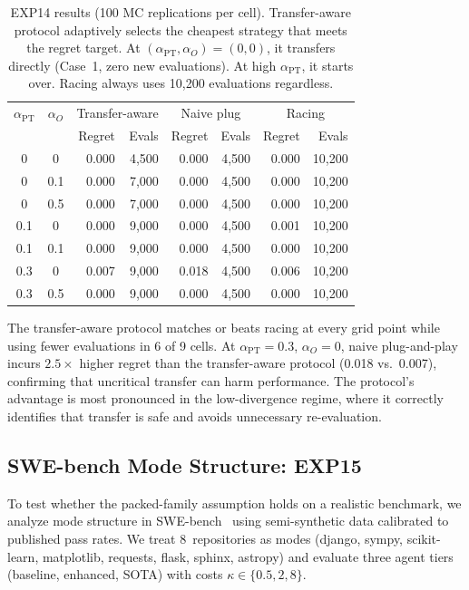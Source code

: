 \documentclass[11pt]{article}
\begin{document}
\begin{table}[t]
\centering
\caption{EXP14 results (100 MC replications per cell). Transfer-aware
  protocol adaptively selects the cheapest strategy that meets the
  regret target. At $(\alpha_{\mathrm{PT}}, \alpha_O) = (0, 0)$, it
  transfers directly (Case~1, zero new evaluations). At high
  $\alpha_{\mathrm{PT}}$, it starts over. Racing always uses
  10,200 evaluations regardless.}
\label{tab:exp14}
\small
\begin{tabular}{@{}cc|rr|rr|rr@{}}
\toprule
$\alpha_{\mathrm{PT}}$ & $\alpha_O$ &
  \multicolumn{2}{c|}{Transfer-aware} &
  \multicolumn{2}{c|}{Naive plug} &
  \multicolumn{2}{c}{Racing} \\
& & Regret & Evals & Regret & Evals & Regret & Evals \\
\midrule
0   & 0   & 0.000 & 4,500  & 0.000 & 4,500  & 0.000 & 10,200 \\
0   & 0.1 & 0.000 & 7,000  & 0.000 & 4,500  & 0.000 & 10,200 \\
0   & 0.5 & 0.000 & 7,000  & 0.000 & 4,500  & 0.000 & 10,200 \\
0.1 & 0   & 0.000 & 9,000  & 0.000 & 4,500  & 0.001 & 10,200 \\
0.1 & 0.1 & 0.000 & 9,000  & 0.000 & 4,500  & 0.000 & 10,200 \\
0.3 & 0   & 0.007 & 9,000  & 0.018 & 4,500  & 0.006 & 10,200 \\
0.3 & 0.5 & 0.000 & 9,000  & 0.000 & 4,500  & 0.000 & 10,200 \\
\bottomrule
\end{tabular}
\end{table}

The transfer-aware protocol matches or beats racing at every grid point
while using fewer evaluations in 6 of 9 cells.  At $\alpha_{\mathrm{PT}}
{=}0.3$, $\alpha_O{=}0$, naive plug-and-play incurs $2.5\times$ higher
regret than the transfer-aware protocol (0.018 vs.\ 0.007), confirming
that uncritical transfer can harm performance.  The protocol's advantage
is most pronounced in the low-divergence regime, where it correctly
identifies that transfer is safe and avoids unnecessary re-evaluation.

\subsection{SWE-bench Mode Structure: EXP15}
\label{sec:exp15}

To test whether the packed-family assumption holds on a realistic
benchmark, we analyze mode structure in SWE-bench~\citep{jimenez2024swebench}
using semi-synthetic data calibrated to published pass rates.  We treat
8~repositories as modes (django, sympy, scikit-learn, matplotlib, requests,
flask, sphinx, astropy) and evaluate three agent tiers (baseline, enhanced,
SOTA) with costs $\kappa \in \{0.5, 2, 8\}$.
\end{document}
